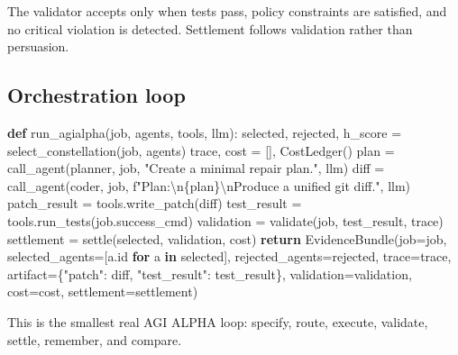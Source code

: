\documentclass[
  11pt,
]{article}
\newenvironment{Shaded}{}{}
\newcommand{\BuiltInTok}[1]{\textcolor[rgb]{0.00,0.50,0.00}{#1}}
\newcommand{\CharTok}[1]{\textcolor[rgb]{0.25,0.44,0.63}{#1}}
\newcommand{\ControlFlowTok}[1]{\textcolor[rgb]{0.00,0.44,0.13}{\textbf{#1}}}
\newcommand{\KeywordTok}[1]{\textcolor[rgb]{0.00,0.44,0.13}{\textbf{#1}}}
\newcommand{\NormalTok}[1]{#1}
\newcommand{\OperatorTok}[1]{\textcolor[rgb]{0.40,0.40,0.40}{#1}}
\newcommand{\SpecialCharTok}[1]{\textcolor[rgb]{0.25,0.44,0.63}{#1}}
\newcommand{\SpecialStringTok}[1]{\textcolor[rgb]{0.73,0.40,0.53}{#1}}
\newcommand{\StringTok}[1]{\textcolor[rgb]{0.25,0.44,0.63}{#1}}
\begin{document}
The validator accepts only when tests pass, policy constraints are
satisfied, and no critical violation is detected. Settlement follows
validation rather than persuasion.

\subsection{Orchestration loop}\label{orchestration-loop}

\begin{Shaded}
\begin{Highlighting}[]
\KeywordTok{def}\NormalTok{ run\_agialpha(job, agents, tools, llm):}
\NormalTok{    selected, rejected, h\_score }\OperatorTok{=}\NormalTok{ select\_constellation(job, agents)}
\NormalTok{    trace, cost }\OperatorTok{=}\NormalTok{ [], CostLedger()}
\NormalTok{    plan }\OperatorTok{=}\NormalTok{ call\_agent(planner, job, }\StringTok{"Create a minimal repair plan."}\NormalTok{, llm)}
\NormalTok{    diff }\OperatorTok{=}\NormalTok{ call\_agent(coder, job, }\SpecialStringTok{f"Plan:}\CharTok{\textbackslash{}n}\SpecialCharTok{\{}\NormalTok{plan}\SpecialCharTok{\}}\CharTok{\textbackslash{}n}\SpecialStringTok{Produce a unified git diff."}\NormalTok{, llm)}
\NormalTok{    patch\_result }\OperatorTok{=}\NormalTok{ tools.write\_patch(diff)}
\NormalTok{    test\_result }\OperatorTok{=}\NormalTok{ tools.run\_tests(job.success\_cmd)}
\NormalTok{    validation }\OperatorTok{=}\NormalTok{ validate(job, test\_result, trace)}
\NormalTok{    settlement }\OperatorTok{=}\NormalTok{ settle(selected, validation, cost)}
    \ControlFlowTok{return}\NormalTok{ EvidenceBundle(job}\OperatorTok{=}\NormalTok{job, selected\_agents}\OperatorTok{=}\NormalTok{[a.}\BuiltInTok{id} \ControlFlowTok{for}\NormalTok{ a }\KeywordTok{in}\NormalTok{ selected],}
\NormalTok{                          rejected\_agents}\OperatorTok{=}\NormalTok{rejected, trace}\OperatorTok{=}\NormalTok{trace,}
\NormalTok{                          artifact}\OperatorTok{=}\NormalTok{\{}\StringTok{"patch"}\NormalTok{: diff, }\StringTok{"test\_result"}\NormalTok{: test\_result\},}
\NormalTok{                          validation}\OperatorTok{=}\NormalTok{validation, cost}\OperatorTok{=}\NormalTok{cost, settlement}\OperatorTok{=}\NormalTok{settlement)}
\end{Highlighting}
\end{Shaded}

This is the smallest real AGI ALPHA loop: specify, route, execute,
validate, settle, remember, and compare.
\end{document}
